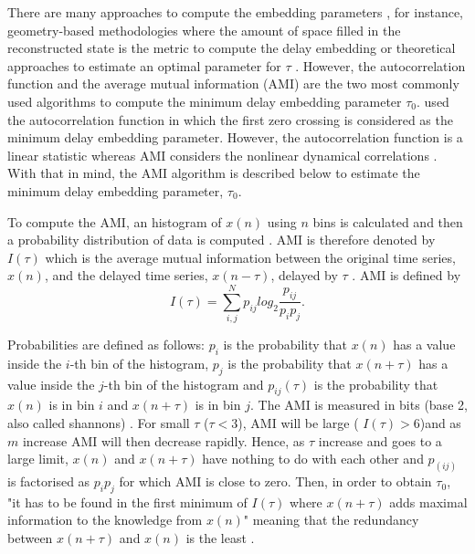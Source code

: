 There are many approaches to compute the embedding parameters 
\citep{bradley2015}, for instance, geometry-based methodologies where 
the amount of space filled in the reconstructed state is the metric to 
compute the delay embedding \citep{mrosenstein1994} or 
theoretical approaches to estimate an optimal parameter for 
$\tau$ \cite{casdagli1991}. 
However, the autocorrelation function and the average mutual information 
(AMI) are the two most commonly used algorithms to compute the minimum 
delay embedding parameter $\tau_0$. \cite{emrani2014a} used the 
autocorrelation function in which the first zero crossing is considered 
as the minimum delay embedding parameter. However, the autocorrelation 
function is a linear statistic whereas AMI considers the nonlinear 
dynamical correlations \citep{afraser1986,krakovska2015}.
With that in mind, the AMI algorithm is described below to estimate 
the minimum delay embedding parameter, \texorpdfstring{$\tau_0$}{T}.

To compute the AMI, an histogram of $x(n)$ using $n$ bins is calculated
and then a probability distribution of data is computed \citep{kantz2003}.
AMI is therefore denoted by $I(\tau)$ which is the average mutual 
information between the original time series, $x(n)$, and the delayed time 
series, $x(n-\tau)$, delayed by $\tau$ \citep{kabiraj2012}. AMI is defined by
\begin{equation}\label{eq:ami}
I(\tau) = \sum_{i,j}^N p_{ij} log_2 \frac{ p_{ij} }{ p_i p_j }.
\end{equation}

Probabilities are defined as follows: 
$p_i$ is the probability that $x(n)$ has a value inside the $i$-th bin of 
the histogram, $p_j$ is the probability that $x(n+\tau)$ has a value inside 
the $j$-th bin of the histogram and $p_{ij}(\tau)$ is the probability 
that $x(n)$ is in bin $i$ and $x(n+\tau)$ is in bin $j$.
The AMI is measured in bits (base 2, also called shannons) 
\citep{kantz2003, nonlinearTseries2016}.
For small $\tau$ ($\tau < 3$), AMI will be large ( $I(\tau)>6$)and as 
$m$ increase AMI will then decrease rapidly. Hence, as $\tau$ increase 
and goes to a large limit, $x(n)$ and $x(n+\tau)$ have 
nothing to do with each other and $p_(ij)$ is factorised as $p_ip_j$ for 
which AMI is close to zero.  Then, in order to obtain $\tau_0$, 
"it has to be found in the first minimum of $I(\tau)$ where $x(n+\tau)$ 
adds maximal information to the knowledge from $x(n)$" meaning that the 
redundancy between $x(n+\tau)$ and $x(n)$ is the least
\citep[p. 151]{kantz2003}.

